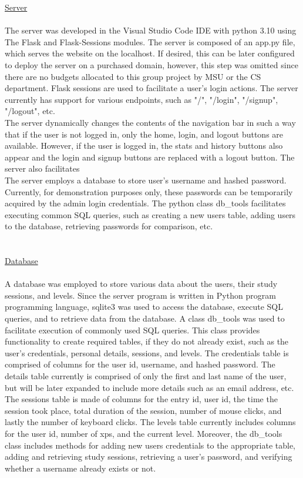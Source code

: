 \documentclass[12pt]{article}
\begin{document}
\noindent \underline{Server}\\
\\The server was developed in the Visual Studio Code IDE with python 3.10 using The Flask and Flask-Sessions modules. The server is composed of an app.py file, which serves the website on the localhost. If desired, this can be later configured to deploy the server on a purchased domain, however, this step was omitted since there are no budgets allocated to this group project by MSU or the CS department. Flask sessions are used to facilitate a user's login actions. The server currently has support for various endpoints, such as "/", "/login", "/signup", "/logout", etc.
\\The server dynamically changes the contents of the navigation bar in such a way that if the user is not logged in, only the home, login, and logout buttons are available. However, if the user is logged in, the stats and history buttons also appear and the login and signup buttons are replaced with a logout button. The server also facilitates
\\The server employs a database to store user's username and hashed password. Currently, for demonstration purposes only, these passwords can be temporarily acquired by the admin login credentials. The python class db\_tools facilitates executing common SQL queries, such as creating a new users table, adding users to the database, retrieving passwords for comparison, etc.\\\\\\

\noindent \underline{Database} \\
\\\indent A database was employed to store various data about the users, their study sessions, and levels. Since the server program is written in Python program programming language, sqlite3 was used to access the database, execute SQL queries, and to retrieve data from the database. A class db\_tools was used to facilitate execution of commonly used SQL queries. This class provides functionality to create required tables, if they do not already exist, such as the user's credentials, personal details, sessions, and levels. The credentials table is comprised of columns for the user id, username, and hashed password. The details table currently is comprised of only the first and last name of the user, but will be later expanded to include more details such as an email address, etc. The sessions table is made of columns for the entry id, user id, the time the session took place, total duration of the session, number of mouse clicks, and lastly the number of keyboard clicks. The levels table currently includes columns for the user id, number of xps, and the current level.  Moreover, the db\_tools class includes methods for adding new users credentials to the appropriate table, adding and retrieving study sessions, retrieving a user's password, and verifying whether a username already exists or not. \\\\
\end{document}
